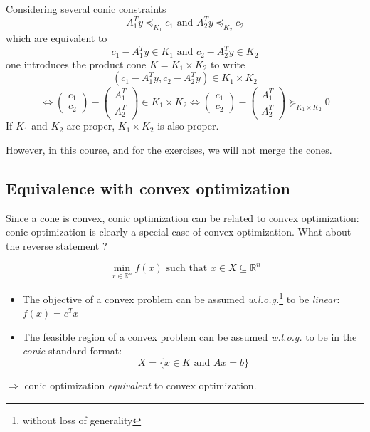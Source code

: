 \begin{definition} 
Considering several conic constraints \[ A_1^T y \preceq_{K_1} c_1
\text{ and } A_2^T y \preceq_{K_2} c_2 \] which are equivalent to
\[ c_1 - A_1^T y \in K_1 \text{ and } c_2 - A_2^T y \in K_2 \] one
introduces the product cone $K = K_1 \times K_2$ to write
\[ (c_1 - A_1^T y, c_2 - A_2^T y) \in K_1 \times K_2
\] \[ \Leftrightarrow \begin{pmatrix} c_1 \\ c_2
\end{pmatrix} -
\begin{pmatrix} A_1^T \\ A_2^T \end{pmatrix} \in K_1 \times K_2
\Leftrightarrow
 \begin{pmatrix} c_1 \\ c_2 \end{pmatrix} -
\begin{pmatrix} A_1^T \\ A_2^T \end{pmatrix} \succeq_{K_1 \times K_2} 0 \]
If $K_1$ and $K_2$ are proper, $K_1 \times K_2$ is also proper.
\end{definition}

However, in this course, and for the exercises, we will not merge the cones.

\subsection{Equivalence with convex optimization} 
Since a cone is convex, conic optimization can be related to convex optimization: conic optimization is clearly a special case of convex optimization. What about the reverse statement ?

\[ \min_{x \in \mathbb{R}^n} f(x) \text{ such that } x \in X \subseteq
\mathbb{R}^n \]

\begin{itemize}
\item The objective of a convex problem can be assumed
\emph{w.l.o.g.}\footnote{without loss of generality} to be \emph{linear}: $f(x) = c^T x$

\item The feasible region of a convex problem can be assumed
\emph{w.l.o.g.} to be in the \emph{conic} standard format: \[ X
= \{ x \in K \text{ and } A x = b \} \]
\end{itemize}

$\Rightarrow$ conic optimization \emph{equivalent} to convex
optimization. \\

